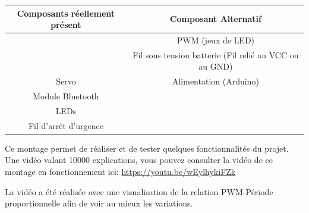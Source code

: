   			\begin{table}[hb]\begin{center}
	  			\begin{tabular}{c|c}
	  			Composants réellement présent & Composant Alternatif\\
	  			\hline
	  			\pic & PWM (jeux de LED) \\ 
	  			\dspic & Fil sous tension batterie (Fil relié au VCC ou au GND)\\
	  			 Servo &  Alimentation (Arduino) \\
	  			 Module Bluetooth &\\ 
	  			 LEDs &\\
	  			 Fil d'arrêt d'urgence &\\
	  			
	  			\end{tabular}\end{center}
  			\end{table}
 Ce montage permet de réaliser et de tester quelques fonctionnalités du projet. Une vidéo valant 10000 explications, vous pouvez consulter la vidéo de ce montage en fonctionnement ici: \url{ https://youtu.be/wEylhykiFZk}
\begin{tcolorbox}[center,width=0.9\textwidth, colframe=red!90!orange, colback=orange!25, arc=3mm,boxrule=1mm, sharp corners=east,title=Note]
			La vidéo a été réalisée avec une visualisation de la relation PWM-Période proportionnelle afin de voir au mieux les variations.
  			\end{tcolorbox}
